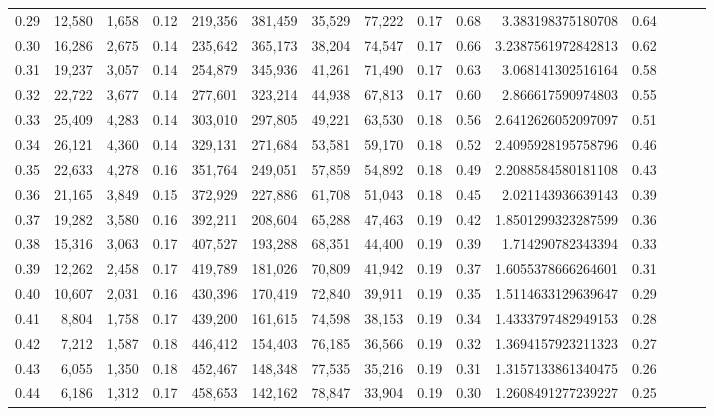 \begin{tabular}{rrrrrrrrrrrrrrr}
0.29 &  12,580 &  1,658 &  0.12 &  219,356 &  381,459 &   35,529 &   77,222 &  0.17 &  0.68 &     3.383198375180708 &      0.64 \\
0.30 &  16,286 &  2,675 &  0.14 &  235,642 &  365,173 &   38,204 &   74,547 &  0.17 &  0.66 &    3.2387561972842813 &      0.62 \\
0.31 &  19,237 &  3,057 &  0.14 &  254,879 &  345,936 &   41,261 &   71,490 &  0.17 &  0.63 &     3.068141302516164 &      0.58 \\
0.32 &  22,722 &  3,677 &  0.14 &  277,601 &  323,214 &   44,938 &   67,813 &  0.17 &  0.60 &     2.866617590974803 &      0.55 \\
0.33 &  25,409 &  4,283 &  0.14 &  303,010 &  297,805 &   49,221 &   63,530 &  0.18 &  0.56 &    2.6412626052097097 &      0.51 \\
0.34 &  26,121 &  4,360 &  0.14 &  329,131 &  271,684 &   53,581 &   59,170 &  0.18 &  0.52 &    2.4095928195758796 &      0.46 \\
0.35 &  22,633 &  4,278 &  0.16 &  351,764 &  249,051 &   57,859 &   54,892 &  0.18 &  0.49 &    2.2088584580181108 &      0.43 \\
0.36 &  21,165 &  3,849 &  0.15 &  372,929 &  227,886 &   61,708 &   51,043 &  0.18 &  0.45 &     2.021143936639143 &      0.39 \\
0.37 &  19,282 &  3,580 &  0.16 &  392,211 &  208,604 &   65,288 &   47,463 &  0.19 &  0.42 &    1.8501299323287599 &      0.36 \\
0.38 &  15,316 &  3,063 &  0.17 &  407,527 &  193,288 &   68,351 &   44,400 &  0.19 &  0.39 &     1.714290782343394 &      0.33 \\
0.39 &  12,262 &  2,458 &  0.17 &  419,789 &  181,026 &   70,809 &   41,942 &  0.19 &  0.37 &    1.6055378666264601 &      0.31 \\
0.40 &  10,607 &  2,031 &  0.16 &  430,396 &  170,419 &   72,840 &   39,911 &  0.19 &  0.35 &    1.5114633129639647 &      0.29 \\
0.41 &   8,804 &  1,758 &  0.17 &  439,200 &  161,615 &   74,598 &   38,153 &  0.19 &  0.34 &    1.4333797482949153 &      0.28 \\
0.42 &   7,212 &  1,587 &  0.18 &  446,412 &  154,403 &   76,185 &   36,566 &  0.19 &  0.32 &    1.3694157923211323 &      0.27 \\
0.43 &   6,055 &  1,350 &  0.18 &  452,467 &  148,348 &   77,535 &   35,216 &  0.19 &  0.31 &    1.3157133861340475 &      0.26 \\
0.44 &   6,186 &  1,312 &  0.17 &  458,653 &  142,162 &   78,847 &   33,904 &  0.19 &  0.30 &    1.2608491277239227 &      0.25 \\

\end{tabular}
